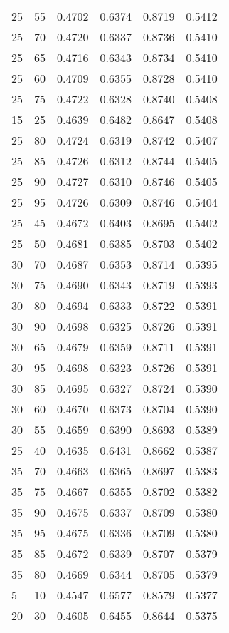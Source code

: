 \begin{center}
\begin{longtable}{|l|l|l|l|l|l|}
25 & 55 & 0.4702 & 0.6374 & 0.8719 & 0.5412 \\
25 & 70 & 0.4720 & 0.6337 & 0.8736 & 0.5410 \\
25 & 65 & 0.4716 & 0.6343 & 0.8734 & 0.5410 \\
25 & 60 & 0.4709 & 0.6355 & 0.8728 & 0.5410 \\
25 & 75 & 0.4722 & 0.6328 & 0.8740 & 0.5408 \\
15 & 25 & 0.4639 & 0.6482 & 0.8647 & 0.5408 \\
25 & 80 & 0.4724 & 0.6319 & 0.8742 & 0.5407 \\
25 & 85 & 0.4726 & 0.6312 & 0.8744 & 0.5405 \\
25 & 90 & 0.4727 & 0.6310 & 0.8746 & 0.5405 \\
25 & 95 & 0.4726 & 0.6309 & 0.8746 & 0.5404 \\
25 & 45 & 0.4672 & 0.6403 & 0.8695 & 0.5402 \\
25 & 50 & 0.4681 & 0.6385 & 0.8703 & 0.5402 \\
30 & 70 & 0.4687 & 0.6353 & 0.8714 & 0.5395 \\
30 & 75 & 0.4690 & 0.6343 & 0.8719 & 0.5393 \\
30 & 80 & 0.4694 & 0.6333 & 0.8722 & 0.5391 \\
30 & 90 & 0.4698 & 0.6325 & 0.8726 & 0.5391 \\
30 & 65 & 0.4679 & 0.6359 & 0.8711 & 0.5391 \\
30 & 95 & 0.4698 & 0.6323 & 0.8726 & 0.5391 \\
30 & 85 & 0.4695 & 0.6327 & 0.8724 & 0.5390 \\
30 & 60 & 0.4670 & 0.6373 & 0.8704 & 0.5390 \\
30 & 55 & 0.4659 & 0.6390 & 0.8693 & 0.5389 \\
25 & 40 & 0.4635 & 0.6431 & 0.8662 & 0.5387 \\
35 & 70 & 0.4663 & 0.6365 & 0.8697 & 0.5383 \\
35 & 75 & 0.4667 & 0.6355 & 0.8702 & 0.5382 \\
35 & 90 & 0.4675 & 0.6337 & 0.8709 & 0.5380 \\
35 & 95 & 0.4675 & 0.6336 & 0.8709 & 0.5380 \\
35 & 85 & 0.4672 & 0.6339 & 0.8707 & 0.5379 \\
35 & 80 & 0.4669 & 0.6344 & 0.8705 & 0.5379 \\
5  & 10 & 0.4547 & 0.6577 & 0.8579 & 0.5377 \\
20 & 30 & 0.4605 & 0.6455 & 0.8644 & 0.5375 \\

\end{longtable}
\end{center}
